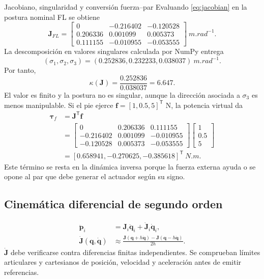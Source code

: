 \documentclass[11pt,letterpaper]{article}
\newcommand{\vect}[1]{\bm{#1}}
\newcommand{\mat}[1]{\bm{#1}}
\newcommand{\trans}{^{\mathsf T}}
\begin{document}
\begin{workedexample}{Jacobiano, singularidad y conversión fuerza--par}
Evaluando \cref{eq:jacobian} en la postura nominal FL se obtiene
\[
\mat J_{FL}=\begin{bmatrix}
0&-0.216402&-0.120528\\
0.206336&0.001099&0.005373\\
0.111155&-0.010955&-0.053555
\end{bmatrix}\ \si{m.rad^{-1}}.
\]
La descomposición en valores singulares calculada por NumPy entrega
\[
 (\sigma_1,\sigma_2,\sigma_3)=(0.252836,0.232233,0.038037)\ \si{m.rad^{-1}}.
\]
Por tanto,
\[
 \boxed{\kappa(\mat J)=\frac{0.252836}{0.038037}=6.647}.
\]
El valor es finito y la postura no es singular, aunque la dirección asociada a
$\sigma_3$ es menos manipulable. Si el pie ejerce
$\vect f=[1,0.5,5]\trans$ N, la potencia virtual da
\begin{align*}
 \vect\tau_f&=\mat J\trans\vect f\\
 &=\begin{bmatrix}
0&0.206336&0.111155\\-0.216402&0.001099&-0.010955\\
-0.120528&0.005373&-0.053555
\end{bmatrix}
\begin{bmatrix}1\\0.5\\5\end{bmatrix}\\
&=\boxed{[0.658941,-0.270625,-0.385618]\trans\ \si{N.m}}.
\end{align*}
Este término se resta en la dinámica inversa porque la fuerza externa ayuda o
se opone al par que debe generar el actuador según su signo.
\end{workedexample}

\subsection{Cinemática diferencial de segundo orden}
\begin{align}
 \ddot{\vect p}_i&=\mat J_i\ddot{\vect q}_i+\dot{\mat J}_i\dot{\vect q}_i,
 \label{eq:accel}\\
 \dot{\mat J}(\vect q,\dot{\vect q})&\approx
 \frac{\mat J(\vect q+h\dot{\vect q})-
 \mat J(\vect q-h\dot{\vect q})}{2h}.\label{eq:jdot}
\end{align}
$\dot{\mat J}$ debe verificarse contra diferencias finitas independientes. Se
comprueban límites articulares y cartesianos de posición, velocidad y
aceleración antes de emitir referencias.
\end{document}
